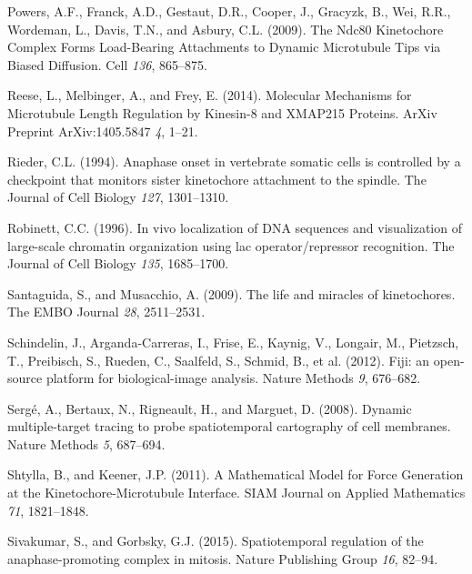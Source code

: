 \documentclass[12pt,a4paper,twoside,openright]{book}
\begin{document}
Powers, A.F., Franck, A.D., Gestaut, D.R., Cooper, J., Gracyzk, B., Wei,
R.R., Wordeman, L., Davis, T.N., and Asbury, C.L. (2009). The Ndc80
Kinetochore Complex Forms Load-Bearing Attachments to Dynamic
Microtubule Tips via Biased Diffusion. Cell \emph{136}, 865--875.

Reese, L., Melbinger, A., and Frey, E. (2014). Molecular Mechanisms for
Microtubule Length Regulation by Kinesin-8 and XMAP215 Proteins. ArXiv
Preprint ArXiv:1405.5847 \emph{4}, 1--21.

Rieder, C.L. (1994). Anaphase onset in vertebrate somatic cells is
controlled by a checkpoint that monitors sister kinetochore attachment
to the spindle. The Journal of Cell Biology \emph{127}, 1301--1310.

Robinett, C.C. (1996). In vivo localization of DNA sequences and
visualization of large-scale chromatin organization using lac
operator/repressor recognition. The Journal of Cell Biology \emph{135},
1685--1700.

Santaguida, S., and Musacchio, A. (2009). The life and miracles of
kinetochores. The EMBO Journal \emph{28}, 2511--2531.

Schindelin, J., Arganda-Carreras, I., Frise, E., Kaynig, V., Longair,
M., Pietzsch, T., Preibisch, S., Rueden, C., Saalfeld, S., Schmid, B.,
et al. (2012). Fiji: an open-source platform for biological-image
analysis. Nature Methods \emph{9}, 676--682.

Sergé, A., Bertaux, N., Rigneault, H., and Marguet, D. (2008). Dynamic
multiple-target tracing to probe spatiotemporal cartography of cell
membranes. Nature Methods \emph{5}, 687--694.

Shtylla, B., and Keener, J.P. (2011). A Mathematical Model for Force
Generation at the Kinetochore-Microtubule Interface. SIAM Journal on
Applied Mathematics \emph{71}, 1821--1848.

Sivakumar, S., and Gorbsky, G.J. (2015). Spatiotemporal regulation of
the anaphase-promoting complex in mitosis. Nature Publishing Group
\emph{16}, 82--94.
\end{document}
